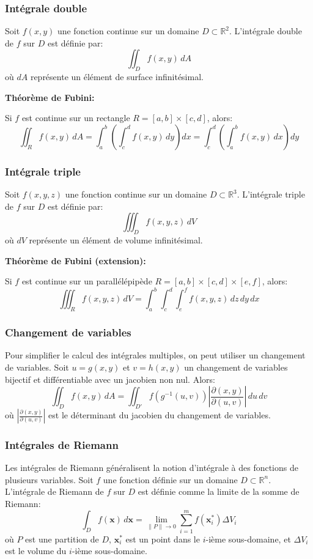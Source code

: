 \subsubsection{Intégrale double}

Soit $f(x, y)$ une fonction continue sur un domaine $D \subset \mathbb{R}^2$. L'intégrale double de $f$ sur $D$ est définie par:
$$
\iint_D f(x, y) \, dA
$$
où $dA$ représente un élément de surface infinitésimal.

\textbf{Théorème de Fubini:}

Si $f$ est continue sur un rectangle $R = [a, b] \times [c, d]$, alors:
$$
\iint_R f(x, y) \, dA = \int_a^b \left( \int_c^d f(x, y) \, dy \right) dx = \int_c^d \left( \int_a^b f(x, y) \, dx \right) dy
$$

\subsubsection{Intégrale triple}

Soit $f(x, y, z)$ une fonction continue sur un domaine $D \subset \mathbb{R}^3$. L'intégrale triple de $f$ sur $D$ est définie par:
$$
\iiint_D f(x, y, z) \, dV
$$
où $dV$ représente un élément de volume infinitésimal.

\textbf{Théorème de Fubini (extension):}

Si $f$ est continue sur un parallélépipède $R = [a, b] \times [c, d] \times [e, f]$, alors:
$$
\iiint_R f(x, y, z) \, dV = \int_a^b \int_c^d \int_e^f f(x, y, z) \, dz \, dy \, dx
$$

\subsubsection{Changement de variables}

Pour simplifier le calcul des intégrales multiples, on peut utiliser un changement de variables. Soit $u = g(x, y)$ et $v = h(x, y)$ un changement de variables bijectif et différentiable avec un jacobien non nul. Alors:
$$
\iint_D f(x, y) \, dA = \iint_{D'} f(g^{-1}(u, v)) \left| \frac{\partial(x, y)}{\partial(u, v)} \right| \, du \, dv
$$
où $\left| \frac{\partial(x, y)}{\partial(u, v)} \right|$ est le déterminant du jacobien du changement de variables.

\subsubsection{Intégrales de Riemann}

Les intégrales de Riemann généralisent la notion d'intégrale à des fonctions de plusieurs variables. Soit $f$ une fonction définie sur un domaine $D \subset \mathbb{R}^n$. L'intégrale de Riemann de $f$ sur $D$ est définie comme la limite de la somme de Riemann:
$$
\int_D f(\mathbf{x}) \, d\mathbf{x} = \lim_{\|P\| \to 0} \sum_{i=1}^m f(\mathbf{x}_i^*) \Delta V_i
$$
où $P$ est une partition de $D$, $\mathbf{x}_i^*$ est un point dans le $i$-ième sous-domaine, et $\Delta V_i$ est le volume du $i$-ième sous-domaine.

